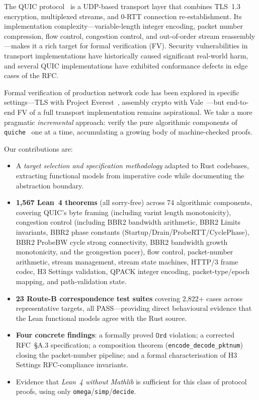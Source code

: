 \documentclass[sigconf,10pt]{acmart}
\begin{document}
The QUIC protocol~\cite{rfc9000} is a UDP-based transport layer that
combines TLS~1.3 encryption, multiplexed streams, and 0-RTT connection
re-establishment.
Its implementation complexity---variable-length integer encoding, packet
number compression, flow control, congestion control, and out-of-order
stream reassembly---makes it a rich target for formal verification (FV).
Security vulnerabilities in transport implementations have historically
caused significant real-world harm, and several QUIC implementations have
exhibited conformance defects in edge cases of the RFC.

Formal verification of production network code has been explored in
specific settings---TLS with Project Everest~\cite{everest}, assembly
crypto with Vale~\cite{vale}---but end-to-end FV of a full transport
implementation remains aspirational.
We take a more pragmatic \emph{incremental} approach: verify the pure
algorithmic components of \texttt{quiche}~\cite{quiche} one at a time,
accumulating a growing body of machine-checked proofs.

Our contributions are:
\begin{itemize}
  \item A \emph{target selection and specification methodology} adapted
    to Rust codebases, extracting functional models from imperative code
    while documenting the abstraction boundary.
  \item \textbf{1{,}567 Lean~4 theorems} (all sorry-free) across 74 algorithmic
    components, covering QUIC's byte framing (including varint length monotonicity),
    congestion control (including BBR2 bandwidth arithmetic, BBR2 Limits invariants,
    BBR2 phase constants (Startup/Drain/ProbeRTT/CyclePhase), BBR2 ProbeBW cycle
    strong connectivity, BBR2 bandwidth growth monotonicity, and the gcongestion
    pacer), flow control, packet-number arithmetic, stream management, stream
    state machines, HTTP/3 frame codec, H3 Settings validation,
    QPACK integer encoding, packet-type/epoch mapping, and path-validation state.
  \item \textbf{23 Route-B correspondence test suites} covering 2{,}822+ cases
    across representative targets, all PASS---providing direct behavioural
    evidence that the Lean functional models agree with the Rust source.
  \item \textbf{Four concrete findings}: a formally proved $\mathtt{Ord}$
    violation; a corrected RFC~\S A.3 specification; a composition theorem
    (\texttt{encode\_decode\_pktnum}) closing the packet-number pipeline; and
    a formal characterisation of H3 Settings RFC-compliance invariants.
  \item Evidence that \emph{Lean~4 without Mathlib} is sufficient for
    this class of protocol proofs, using only
    \texttt{omega}/\texttt{simp}/\texttt{decide}.
\end{itemize}
\end{document}

